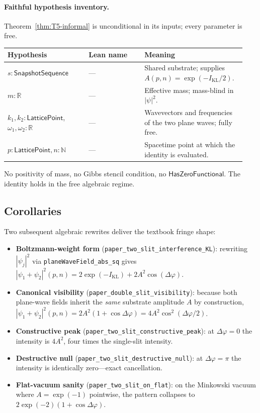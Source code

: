 \documentclass[11pt,a4paper,twoside]{article}
\theoremstyle{definition}
\newcommand{\KL}{I_{\mathrm{KL}}}
\newcommand{\Rbb}{\mathbb{R}}
\newcommand{\Nbb}{\mathbb{N}}
\newcommand{\HasZF}{\mathsf{HasZeroFunctional}}
\newcommand{\SnapSeq}{\mathsf{SnapshotSequence}}
\newcommand{\code}[1]{\texttt{#1}}
\begin{document}
\paragraph{Faithful hypothesis inventory.}
Theorem~\ref{thm:T5-informal} is unconditional in its inputs; every
parameter is free.

\begin{longtable}{@{}p{0.32\linewidth} p{0.22\linewidth} p{0.40\linewidth}@{}}
\toprule
Hypothesis & Lean name & Meaning \\
\midrule
\endhead
$s:\SnapSeq$ & --- & Shared substrate; supplies $A(p,n)=\exp(-\KL/2)$. \\
$m:\Rbb$ & --- & Effective mass; mass-blind in $|\psi|^{2}$. \\
$k_{1},k_{2}:\mathsf{LatticePoint}$, $\omega_{1},\omega_{2}:\Rbb$ & --- & Wavevectors and frequencies of the two plane waves; fully free. \\
$p:\mathsf{LatticePoint}, n:\Nbb$ & --- & Spacetime point at which the identity is evaluated. \\
\bottomrule
\end{longtable}

\noindent No positivity of mass, no Gibbs stencil condition, no
$\HasZF$. The identity holds in the free algebraic regime.

\subsection{Corollaries}\label{sec:T5-coroll}

Two subsequent algebraic rewrites deliver the textbook fringe shape:
\begin{itemize}
\item \textbf{Boltzmann-weight form}
  (\code{paper\_two\_slit\_interference\_KL}): rewriting $|\psi_{j}|^{2}$
  via \code{planeWaveField\_abs\_sq} gives
  $|\psi_{1}+\psi_{2}|^{2}(p,n)=2\exp(-\KL)+2A^{2}\cos(\Delta\varphi)$.
\item \textbf{Canonical visibility} (\code{paper\_double\_slit\_visibility}):
  because both plane-wave fields inherit the \emph{same} substrate
  amplitude $A$ by construction,
  $|\psi_{1}+\psi_{2}|^{2}(p,n)=2A^{2}(1+\cos\Delta\varphi)=4A^{2}\cos^{2}(\Delta\varphi/2)$.
\item \textbf{Constructive peak}
  (\code{paper\_two\_slit\_constructive\_peak}): at $\Delta\varphi=0$
  the intensity is $4A^{2}$, four times the single-slit intensity.
\item \textbf{Destructive null}
  (\code{paper\_two\_slit\_destructive\_null}): at $\Delta\varphi=\pi$
  the intensity is identically zero---exact cancellation.
\item \textbf{Flat-vacuum sanity} (\code{paper\_two\_slit\_on\_flat}):
  on the Minkowski vacuum where $A=\exp(-1)$ pointwise, the pattern
  collapses to $2\exp(-2)(1+\cos\Delta\varphi)$.
\end{itemize}
\end{document}
